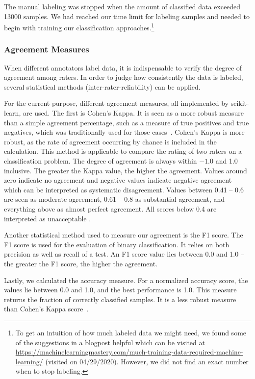 The manual labeling was stopped when the amount of classified data exceeded 13000 samples. We had reached our time limit for labeling samples and needed to begin with training our classification approaches.\footnote{To get an intuition of how much labeled data we might need, we found some of the suggestions in a blogpost helpful which can be visited at \url{https://machinelearningmastery.com/much-training-data-required-machine-learning/} (visited on 04/29/2020). However, we did not find an exact number when to stop labeling.}


\subsubsection{Agreement Measures}
\label{subsec:AgreementMeasures}

When different annotators label data, it is indispensable to verify the degree of agreement among raters. In order to judge how consistently the data is labeled, several statistical methods (inter-rater-reliability) can be applied.

\bigskip
For the current purpose, different agreement measures, all implemented by scikit-learn, are used. The first is Cohen’s Kappa. It is seen as a more robust measure than a simple agreement percentage, such as a measure of true positives and true negatives, which was traditionally used for those cases~\citep{cohen1960coefficient}. Cohen’s Kappa is more robust, as the rate of agreement occurring by chance is included in the calculation. This method is applicable to compare the rating of two raters on a classification problem. The degree of agreement is always within $-1.0$ and 1.0 inclusive. The greater the Kappa value, the higher the agreement. Values around zero indicate no agreement and negative values indicate negative agreement which can be interpreted as systematic disagreement. Values between 0.41 -- 0.6 are seen as moderate agreement, 0.61 -- 0.8 as substantial agreement, and everything above as almost perfect agreement. All scores below 0.4 are interpreted as unacceptable \citep{mchugh2012interrater}.

Another statistical method used to measure our agreement is the F1 score. The F1 score is used for the evaluation of binary classification. It relies on both precision as well as recall of a test. An F1 score value lies between 0.0 and 1.0 -- the greater the F1 score, the higher the agreement.

Lastly, we calculated the accuracy measure. For a normalized accuracy score, the values lie between 0.0 and 1.0, and the best performance is 1.0. This measure returns the fraction of correctly classified samples. It is a less robust measure than Cohen’s Kappa score~\citep{mchugh2012interrater}.


